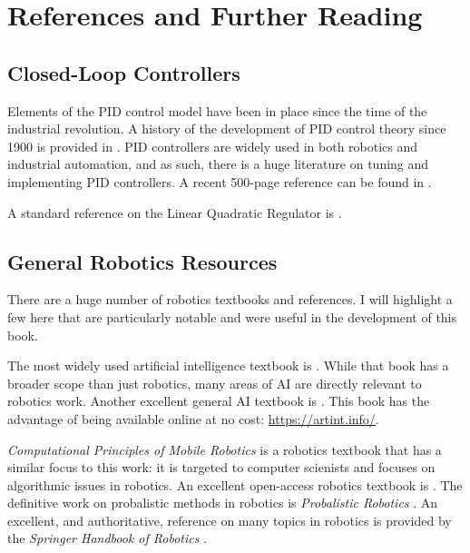 \section{References and Further Reading}

\subsection{Closed-Loop Controllers}

Elements of the PID control model have been in place since the time of
the industrial revolution.  A history of the development of PID
control theory since 1900 is provided in \parencite{BENNETT200143}.
PID controllers are widely used in both robotics and industrial
automation, and as such, there is a huge literature on tuning and
implementing PID controllers. A recent 500-page reference can be found
in \parencite{johnson2006pid}.

A standard reference on the Linear Quadratic Regulator is
\parencite{anderson2007optimal}.

\subsection{General Robotics Resources}

There are a huge number of robotics textbooks and references.  I will
highlight a few here that are particularly notable and were useful in
the development of this book.

The most widely used artificial intelligence textbook is
\parencite{Russell2003}. While that book has a broader scope than just
robotics, many areas of AI are directly relevant to robotics
work. Another excellent general AI textbook is
\parencite{PooleMackworth17}.  This book has the advantage of being
available online at no cost: \url{https://artint.info/}.

\emph{Computational Principles of Mobile Robotics}
\parencite{dudek2010} is a robotics textbook that has a similar focus
to this work: it is targeted to computer scienists and focuses on
algorithmic issues in robotics.  An excellent open-access robotics
textbook is \parencite{correll2022introduction}.  The definitive work
on probalistic methods in robotics is \emph{Probalistic Robotics}
\parencite{thrun2005}.  An excellent, and authoritative, reference on
many topics in robotics is provided by the \emph{Springer Handbook of
  Robotics} \parencite{siciliano2008}.

